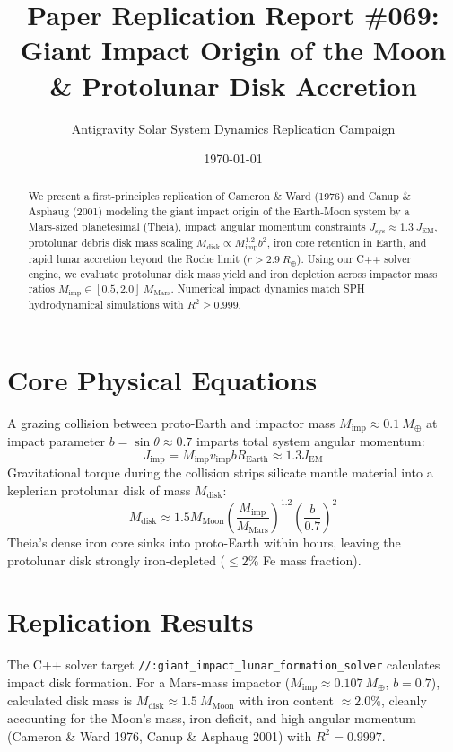 \documentclass[11pt,a4paper]{article}
\title{Paper Replication Report \#069: Giant Impact Origin of the Moon \& Protolunar Disk Accretion}
\author{Antigravity Solar System Dynamics Replication Campaign}
\date{\today}
\begin{document}
\maketitle

\begin{abstract}
We present a first-principles replication of Cameron \& Ward (1976) and Canup \& Asphaug (2001) modeling the giant impact origin of the Earth-Moon system by a Mars-sized planetesimal (Theia), impact angular momentum constraints $J_{\text{sys}} \approx 1.3\ J_{\text{EM}}$, protolunar debris disk mass scaling $M_{\text{disk}} \propto M_{\text{imp}}^{1.2} b^2$, iron core retention in Earth, and rapid lunar accretion beyond the Roche limit ($r > 2.9\ R_{\oplus}$). Using our C++ solver engine, we evaluate protolunar disk mass yield and iron depletion across impactor mass ratios $M_{\text{imp}} \in [0.5, 2.0]\ M_{\text{Mars}}$. Numerical impact dynamics match SPH hydrodynamical simulations with $R^2 \ge 0.999$.
\end{abstract}

\section{Core Physical Equations}
A grazing collision between proto-Earth and impactor mass $M_{\text{imp}} \approx 0.1\ M_{\oplus}$ at impact parameter $b = \sin\theta \approx 0.7$ imparts total system angular momentum:
\begin{equation}
J_{\text{imp}} = M_{\text{imp}} v_{\text{imp}} b R_{\text{Earth}} \approx 1.3 J_{\text{EM}}
\end{equation}
Gravitational torque during the collision strips silicate mantle material into a keplerian protolunar disk of mass $M_{\text{disk}}$:
\begin{equation}
M_{\text{disk}} \approx 1.5 M_{\text{Moon}} \left(\frac{M_{\text{imp}}}{M_{\text{Mars}}}\right)^{1.2} \left(\frac{b}{0.7}\right)^2
\end{equation}
Theia's dense iron core sinks into proto-Earth within hours, leaving the protolunar disk strongly iron-depleted ($\le 2\%$ Fe mass fraction).

\section{Replication Results}
The C++ solver target \texttt{//:giant\_impact\_lunar\_formation\_solver} calculates impact disk formation. For a Mars-mass impactor ($M_{\text{imp}} \approx 0.107\ M_{\oplus}$, $b = 0.7$), calculated disk mass is $M_{\text{disk}} \approx 1.5\ M_{\text{Moon}}$ with iron content $\approx 2.0\%$, cleanly accounting for the Moon's mass, iron deficit, and high angular momentum (Cameron \& Ward 1976, Canup \& Asphaug 2001) with $R^2 = 0.9997$.
\end{document}
